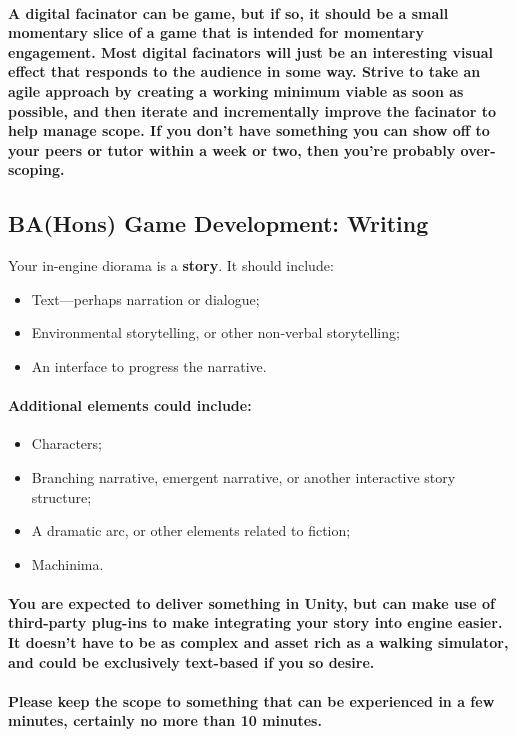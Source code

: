 \documentclass{../../fal_assignment}
\begin{document}
\paragraph{A digital facinator can be game, but if so, it should be a small momentary slice of a game that is intended for momentary engagement. Most digital facinators will just be an interesting visual effect that responds to the audience in some way. Strive to take an agile approach by creating a working minimum viable as soon as possible, and then iterate and incrementally improve the facinator to help manage scope. If you don't have something you can show off to your peers or tutor within a week or two, then you're probably over-scoping.}

\subsection*{BA(Hons) Game Development: Writing}

Your in-engine diorama is a \textbf{story}. It should include:
\begin{itemize}
\item Text---perhaps narration or dialogue;
\item Environmental storytelling, or other non-verbal storytelling; 
\item An interface to progress the narrative.
\end{itemize}
\paragraph{Additional elements could include:}
\begin{itemize}
\item Characters;
\item Branching narrative, emergent narrative, or another interactive story structure;
\item A dramatic arc, or other elements related to fiction; 
\item Machinima.
\end{itemize}
\paragraph{You are expected to deliver something in Unity, but can make use of third-party plug-ins to make integrating your story into engine easier. It doesn't have to be as complex and asset rich as a walking simulator, and could be exclusively text-based if you so desire.}

\paragraph{Please keep the scope to something that can be experienced in a few minutes, certainly no more than 10 minutes.}
\end{document}

